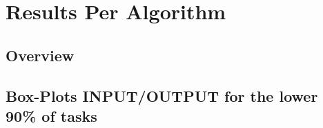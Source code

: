 \newpage{}

\hypertarget{results-per-algorithm}{%
\section{Results Per Algorithm}\label{results-per-algorithm}}

\subsection{Overview}



\newpage
\subsection{Box-Plots INPUT/OUTPUT for the lower 90\% of tasks}



